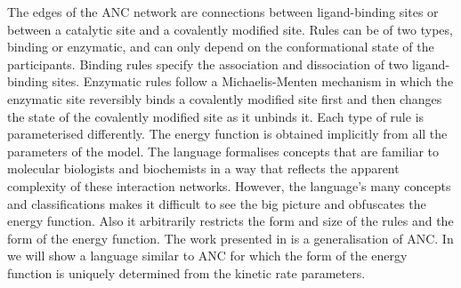 The edges of the ANC network are connections between ligand-binding sites
or between a catalytic site and a covalently modified site.
Rules can be of two types, binding or enzymatic,
and can only depend on the conformational state of the participants.
Binding rules specify the association and dissociation of
two ligand-binding sites.
Enzymatic rules follow a Michaelis-Menten mechanism in which
the enzymatic site reversibly binds a covalently modified site first
and then changes the state of the covalently modified site
as it unbinds it.
Each type of rule is parameterised differently.
The energy function is obtained implicitly
from all the parameters of the model.
The language formalises concepts that are familiar to
molecular biologists and biochemists
in a way that reflects the apparent complexity
of these interaction networks.
However, the language's many concepts and classifications
makes it difficult to see the big picture %
and obfuscates the energy function. %
Also it arbitrarily restricts the form and size of the rules
and the form of the energy function.
The work presented in  is a generalisation of ANC.
In  we will show a language similar to ANC
for which the form of the energy function is uniquely determined
from the kinetic rate parameters.






